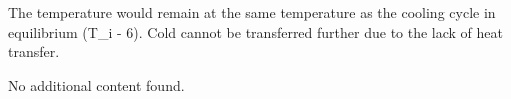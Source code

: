 The temperature would remain at the same temperature as the cooling cycle in equilibrium (T_i - 6).  
Cold cannot be transferred further due to the lack of heat transfer.  

No additional content found.